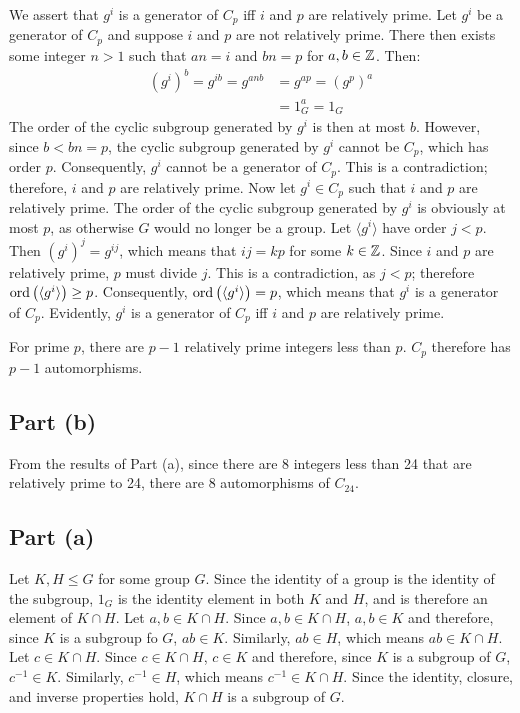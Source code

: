 \documentclass{article}
\begin{document}
We assert that $g^i$ is a generator of $C_p$ iff $i$ and $p$ are relatively prime. Let $g^i$ be a generator of $C_p$ and suppose $i$ and $p$ are not relatively prime. There then exists some integer $n > 1$ such that $an = i$ and $bn = p$ for $a, b \in \mathbb{Z}$. Then:
\begin{equation}
    \begin{split}
        \left(g^{i}\right)^b = g^{ib} = g^{anb} & = g^{ap} = \left(g^p\right)^a \\
        & = 1_G^a = 1_G
    \end{split}
\end{equation}
The order of the cyclic subgroup generated by $g^i$ is then at most $b$. However, since $b < bn = p$, the cyclic subgroup generated by $g^i$ cannot be $C_p$, which has order $p$. Consequently, $g^i$ cannot be a generator of $C_p$. This is a contradiction; therefore, $i$ and $p$ are relatively prime. Now let $g^i \in C_p$ such that $i$ and $p$ are relatively prime. The order of the cyclic subgroup generated by $g^i$ is obviously at most $p$, as otherwise $G$ would no longer be a group. Let $\langle g^i \rangle$ have order $j < p$. Then $\left(g^i\right)^j = g^{ij}$, which means that $ij = kp$ for some $k \in \mathbb{Z}$. Since $i$ and $p$ are relatively prime, $p$ must divide $j$. This is a contradiction, as $j < p$; therefore $\operatorname{ord}\left(\langle g^i \rangle\right) \geq p$. Consequently, $\operatorname{ord}\left(\langle g^i \rangle\right) = p$, which means that $g^i$ is a generator of $C_p$. Evidently, $g^i$ is a generator of $C_p$ iff $i$ and $p$ are relatively prime.

For prime $p$, there are $p - 1$ relatively prime integers less than $p$. $C_p$ therefore has $p - 1$ automorphisms.
\subsection*{Part (b)}
From the results of Part (a), since there are 8 integers less than 24 that are relatively prime to 24, there are 8 automorphisms of $C_{24}$.

\clearpage

\subsection*{Part (a)}
Let $K, H \leq G$ for some group $G$. Since the identity of a group is the identity of the subgroup, $1_G$ is the identity element in both $K$ and $H$, and is therefore an element of $K \cap H$. Let $a, b \in K \cap H$. Since $a, b \in K \cap H$, $a, b \in K$ and therefore, since $K$ is a subgroup fo $G$, $ab \in K$. Similarly, $ab \in H$, which means $ab \in K \cap H$. Let $c \in K \cap H$. Since $c \in K \cap H$, $c \in K$ and therefore, since $K$ is a subgroup of $G$, $c^{-1} \in K$. Similarly, $c^{-1} \in H$, which means $c^{-1} \in K \cap H$. Since the identity, closure, and inverse properties hold, $K \cap H$ is a subgroup of $G$.
\end{document}
